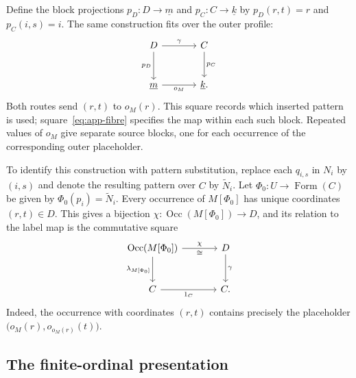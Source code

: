 \documentclass[11pt]{article}
\newcommand{\Occ}{\operatorname{Occ}}
\newcommand{\FormulaSet}{\operatorname{Form}}
\begin{document}
Define the block projections $p_D:D\to\underline m$ and
$p_C:C\to\underline k$ by $p_D(r,t)=r$ and $p_C(i,s)=i$.
The same construction fits over the outer profile:
\begin{equation}\label{eq:app-profile}
\begin{tikzcd}[column sep=large,row sep=large]
 D\arrow[r,"\gamma"]\arrow[d,"p_D"']&C\arrow[d,"p_C"]\\
 \underline m\arrow[r,"o_M"']&\underline k.
\end{tikzcd}
\end{equation}
Both routes send $(r,t)$ to $o_M(r)$. This square records which
inserted pattern is used; square~\eqref{eq:app-fibre} specifies the
map within each such block. Repeated values of $o_M$ give separate
source blocks, one for each occurrence of the corresponding outer
placeholder.

To identify this construction with pattern substitution,
replace each $q_{i,s}$ in $N_i$ by $(i,s)$ and denote the resulting
pattern over $C$ by $\widetilde N_i$. Let
$\Phi_0:U\to\FormulaSet(C)$ be given by $\Phi_0(p_i)=\widetilde N_i$.
Every occurrence of $M[\Phi_0]$ has unique coordinates $(r,t)\in D$.
This gives a bijection $\chi:\Occ(M[\Phi_0])\to D$, and its relation
to the label map is the commutative square
\begin{equation}\label{eq:app-occurrence-labels}
\begin{tikzcd}[column sep=large,row sep=large]
 \Occ(M[\Phi_0])\arrow[r,"\chi","\cong"']
    \arrow[d,"\lambda_{M[\Phi_0]}"']&D\arrow[d,"\gamma"]\\
 C\arrow[r,"1_C"']&C.
\end{tikzcd}
\end{equation}
Indeed, the occurrence with coordinates $(r,t)$ contains precisely
the placeholder $\bigl(o_M(r),o_{o_M(r)}(t)\bigr)$.

\subsection{The finite-ordinal presentation}\label{app:ordinals}
\end{document}
